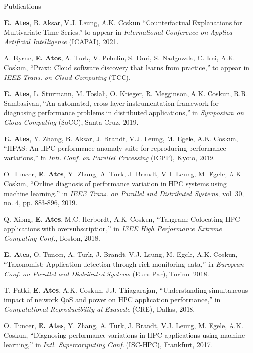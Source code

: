 \documentclass{resume}
\begin{document}
\begin{rSection}{Publications} \itemsep -3pt
\item \textbf{E. Ates}, B. Aksar, V.J. Leung, A.K. Coskun ``Counterfactual
Explanations for Multivariate Time Series.'' to appear in \textit{International
  Conference on Applied Artificial Intelligence} (ICAPAI), 2021.

\item A. Byrne, \textbf{E. Ates}, A. Turk, V. Pchelin, S. Duri, S. Nadgowda, C.
Isci, A.K. Coskun, ``Praxi: Cloud software discovery that learns from
practice,'' to appear in \textit{IEEE Trans. on Cloud Computing} (TCC).

\item \textbf{E. Ates}, L. Sturmann, M. Toslali, O. Krieger, R. Megginson, A.K.
Coskun, R.R. Sambasivan, ``An automated, cross-layer instrumentation framework
for diagnosing performance problems in distributed applications,'' in
\textit{Symposium on Cloud Computing} (SoCC), Santa Cruz, 2019.

\item \textbf{E. Ates}, Y. Zhang, B. Aksar, J. Brandt, V.J. Leung, M.
Egele, A.K. Coskun, ``HPAS: An HPC performance anomaly suite for reproducing
performance variations,'' in \textit{Intl. Conf. on Parallel Processing}
(ICPP), Kyoto, 2019.

\item O. Tuncer, \textbf{E. Ates}, Y. Zhang, A. Turk, J. Brandt, V.J. Leung, M.
Egele, A.K. Coskun, ``Online diagnosis of performance variation in HPC systems
using machine learning,'' in \textit{IEEE Trans. on Parallel and
  Distributed Systems}, vol. 30, no. 4, pp. 883-896, 2019.

\item Q. Xiong, \textbf{E. Ates}, M.C. Herbordt, A.K. Coskun, ``Tangram: Colocating
HPC applications with oversubscription,'' in \textit{IEEE High Performance
  Extreme Computing Conf.}, Boston, 2018.

\item \textbf{E. Ates}, O. Tuncer, A. Turk, J. Brandt, V.J. Leung, M. Egele, A.K.
Coskun, ``Taxonomist: Application detection through rich monitoring data,'' in
\textit{European Conf. on Parallel and Distributed Systems} (Euro-Par),
Torino, 2018.

\item T. Patki, \textbf{E. Ates}, A.K. Coskun, J.J. Thiagarajan, ``Understanding
simultaneous impact of network QoS and power on HPC application performance,''
in \textit{Computational Reproducibility at Exascale} (CRE), Dallas, 2018.

\item O. Tuncer, \textbf{E. Ates}, Y. Zhang, A. Turk, J. Brandt, V.J. Leung, M.
Egele, A.K. Coskun, ``Diagnosing performance variations in HPC applications
using machine learning,'' in \textit{Intl. Supercomputing Conf.} (ISC-HPC),
Frankfurt, 2017.

\end{rSection}
\end{document}
